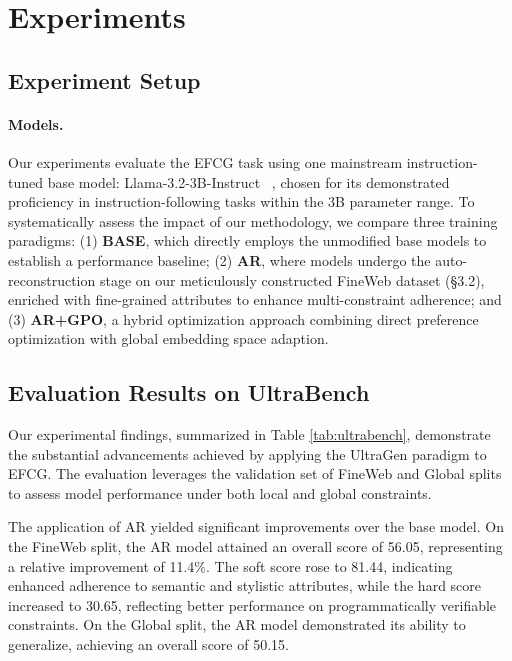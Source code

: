 \section{Experiments}
\subsection{Experiment Setup} 
\paragraph{Models.}


% 
Our experiments evaluate the EFCG task using one mainstream instruction-tuned base model: Llama-3.2-3B-Instruct ~\cite{dubey2024llama}, chosen for its demonstrated proficiency in instruction-following tasks within the 3B parameter range. To systematically assess the impact of our methodology, we compare three training paradigms: (1) \textbf{BASE}, which directly employs the unmodified base models to establish a performance baseline; (2) \textbf{AR}, where models undergo the auto-reconstruction stage on our meticulously constructed FineWeb dataset (§3.2), enriched with fine-grained attributes to enhance multi-constraint adherence; and (3) \textbf{AR+GPO}, a hybrid optimization approach combining direct preference optimization with global embedding space adaption.

\subsection{Evaluation Results on UltraBench}

Our experimental findings, summarized in Table \ref{tab:ultrabench}, demonstrate the substantial advancements achieved by applying the UltraGen paradigm to EFCG. The evaluation leverages the validation set of FineWeb and Global splits to assess model performance under both local and global constraints.

The application of AR yielded significant improvements over the base model. On the FineWeb split, the AR model attained an overall score of 56.05, representing a relative improvement of 11.4\%. The soft score rose to 81.44, indicating enhanced adherence to semantic and stylistic attributes, while the hard score increased to 30.65, reflecting better performance on programmatically verifiable constraints. On the Global split, the AR model demonstrated its ability to generalize, achieving an overall score of 50.15.

